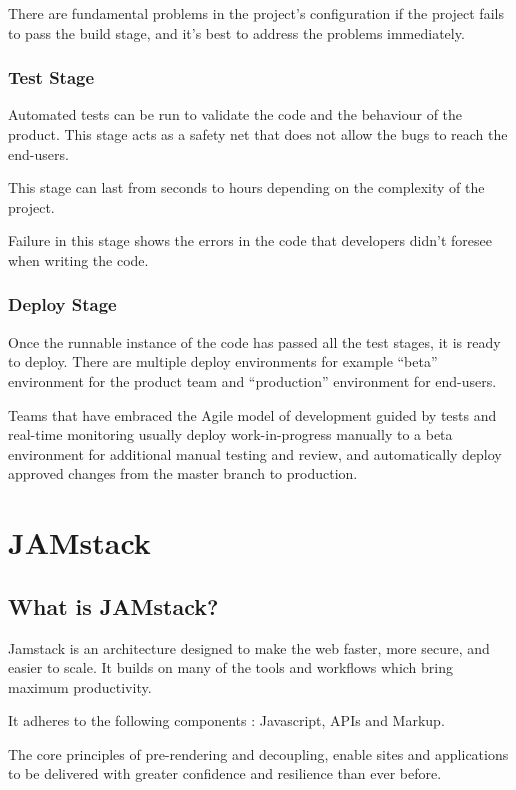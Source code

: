 There are fundamental problems in the project's configuration if the project fails to pass the build 
stage, and it’s best to address the problems immediately.

\subsubsection{Test Stage}

Automated tests can be run to validate the code and the behaviour of the product. This stage acts as a safety
net that does not allow the bugs to reach the end-users.

This stage can last from seconds to hours depending on the complexity of the project.

Failure in this stage shows the errors in the code that developers didn't foresee when writing the code.

\subsubsection{Deploy Stage}

Once the runnable instance of the code has passed all the test stages, it is ready to deploy. There are 
multiple deploy environments for example “beta” environment for the product team and “production” 
environment for end-users.

Teams that have embraced the Agile model of development guided by tests and real-time monitoring usually 
deploy work-in-progress manually to a beta environment for additional manual testing and review, and 
automatically deploy approved changes from the master branch to production.

\section{JAMstack}

\subsection{What is JAMstack?}

Jamstack is an architecture designed to make the web faster, more secure, and easier to scale. 
It builds on many of the tools and workflows which bring maximum productivity.

It adheres to the following components : Javascript, APIs and Markup.

The core principles of pre-rendering and decoupling, enable sites and applications to be delivered 
with greater confidence and resilience than ever before.

